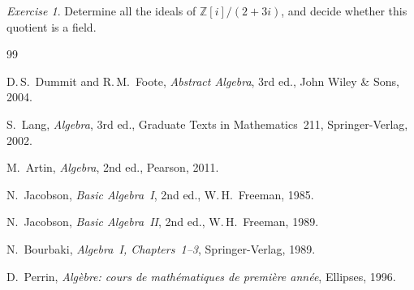 \documentclass[12pt,a4paper,openany]{book}
\theoremstyle{definition}
\theoremstyle{remark}
\newtheorem{exercise}{Exercise}[chapter]
\begin{document}
\begin{exercise}\label{exo:pid-13}
Determine all the ideals of $\mathbb{Z}[i]/(2+3i)$, and decide whether this quotient is a field.
\end{exercise}

\medskip
\begin{center}
\end{center}



\begin{thebibliography}{99}

D.\,S.~Dummit and R.\,M.~Foote,
\textit{Abstract Algebra},
3rd ed., John Wiley \& Sons, 2004.

S.~Lang,
\textit{Algebra},
3rd ed., Graduate Texts in Mathematics~211, Springer-Verlag, 2002.

M.~Artin,
\textit{Algebra},
2nd ed., Pearson, 2011.

N.~Jacobson,
\textit{Basic Algebra~I},
2nd ed., W.\,H.~Freeman, 1985.

N.~Jacobson,
\textit{Basic Algebra~II},
2nd ed., W.\,H.~Freeman, 1989.

N.~Bourbaki,
\textit{Algebra~I, Chapters~1--3},
Springer-Verlag, 1989.

D.~Perrin,
\textit{Alg\`ebre: cours de math\'ematiques de premi\`ere ann\'ee},
Ellipses, 1996.

\end{thebibliography}

\printindex
\end{document}
